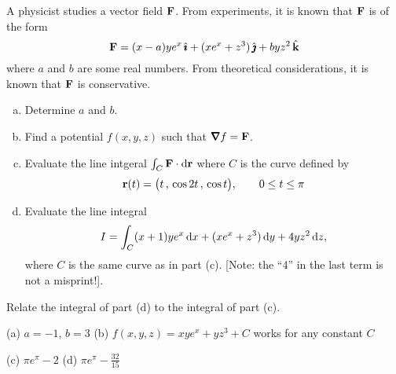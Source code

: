 \begin{question}[M317 2008A] %
A physicist studies a vector field $\mathbf{F}$. From experiments, it is 
known that $\mathbf{F}$ is of the form
\begin{equation*}
\mathbf{F} = (x - a)ye^x\,\hat{\pmb{\imath}} + (xe^x + z^3 )\,\hat{\pmb{\jmath}} + byz^2\,\hat{\mathbf{k}}
\end{equation*}
where $a$ and $b$ are some real numbers. From theoretical considerations, 
it is known that $\mathbf{F}$ is conservative.

\begin{enumerate}[(a)]
\item
Determine $a$ and $b$.
\item
Find a potential $f(x,y,z)$ such that $\vnabla f = \vF$.
\item
Evaluate the line intgeral $\int_C\mathbf{F}\cdot\mathrm{d}\mathbf{r}$ where $C$ is the 
curve defined by 
\begin{equation*}
\mathbf{r}(t) = \big(t\,,\, \cos 2t\,,\, \cos t\big), 
\qquad 0 \le t \le \pi
\end{equation*}
\item
Evaluate the line integral
\begin{equation*}
I = \int_C (x + 1)ye^x \,\mathrm{d}x + (xe^x + z^3 ) \,\mathrm{d}y + 4yz^2 \,\mathrm{d}z,
\end{equation*}
where $C$ is the same curve as in part (c). [Note: the ``4'' in the 
last term is not a misprint!].

\end{enumerate}
\end{question}

\begin{hint} 
Relate the integral of part (d) to the integral of part (c).
\end{hint}

\begin{answer} 
(a) $a=-1$, $b=3$\qquad
(b) $f(x,y,z) = xye^x + yz^3 + C$ works for any constant $C$

(c) $\pi e^\pi-2$\qquad
(d) $\pi e^\pi -\frac{32}{15}$
\end{answer}


